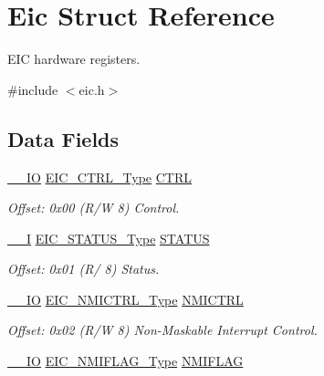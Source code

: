 \hypertarget{struct_eic}{}\section{Eic Struct Reference}
\label{struct_eic}


E\+IC hardware registers.  




{\ttfamily \#include $<$eic.\+h$>$}

\subsection*{Data Fields}
\begin{DoxyCompactItemize}
\item 
\mbox{\hyperlink{core__cm0plus_8h_aec43007d9998a0a0e01faede4133d6be}{\+\_\+\+\_\+\+IO}} \mbox{\hyperlink{union_e_i_c___c_t_r_l___type}{E\+I\+C\+\_\+\+C\+T\+R\+L\+\_\+\+Type}} \mbox{\hyperlink{struct_eic_aaa4da602167c0d59c46db45ee8c3ac6f}{C\+T\+RL}}
\begin{DoxyCompactList}\small\item\em Offset\+: 0x00 (R/W 8) Control. \end{DoxyCompactList}\item 
\mbox{\hyperlink{core__cm0plus_8h_af63697ed9952cc71e1225efe205f6cd3}{\+\_\+\+\_\+I}} \mbox{\hyperlink{union_e_i_c___s_t_a_t_u_s___type}{E\+I\+C\+\_\+\+S\+T\+A\+T\+U\+S\+\_\+\+Type}} \mbox{\hyperlink{struct_eic_a6dae0aa228e8159f984922f8242f6615}{S\+T\+A\+T\+US}}
\begin{DoxyCompactList}\small\item\em Offset\+: 0x01 (R/ 8) Status. \end{DoxyCompactList}\item 
\mbox{\hyperlink{core__cm0plus_8h_aec43007d9998a0a0e01faede4133d6be}{\+\_\+\+\_\+\+IO}} \mbox{\hyperlink{union_e_i_c___n_m_i_c_t_r_l___type}{E\+I\+C\+\_\+\+N\+M\+I\+C\+T\+R\+L\+\_\+\+Type}} \mbox{\hyperlink{struct_eic_a6c2af75a17a20061bd5b4563fb0ae083}{N\+M\+I\+C\+T\+RL}}
\begin{DoxyCompactList}\small\item\em Offset\+: 0x02 (R/W 8) Non-\/\+Maskable Interrupt Control. \end{DoxyCompactList}\item 
\mbox{\hyperlink{core__cm0plus_8h_aec43007d9998a0a0e01faede4133d6be}{\+\_\+\+\_\+\+IO}} \mbox{\hyperlink{union_e_i_c___n_m_i_f_l_a_g___type}{E\+I\+C\+\_\+\+N\+M\+I\+F\+L\+A\+G\+\_\+\+Type}} \mbox{\hyperlink{struct_eic_ae46ec4ce22a99ebcc1e9c145eb709d08}{N\+M\+I\+F\+L\+AG}}

\end{DoxyCompactItemize}
